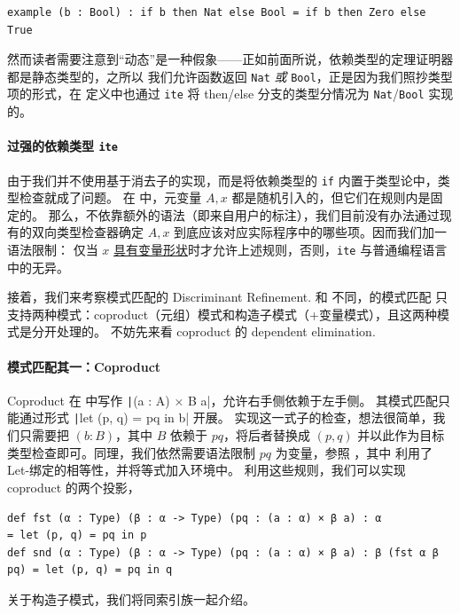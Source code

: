 \documentclass[a4paper, 11pt]{article}
\theoremstyle{remark}\newtheorem*{remark}{Remark}
\theoremstyle{definition}\newtheorem*{definition}{Definition}
\begin{document}
\begin{verbatim}
example (b : Bool) : if b then Nat else Bool = if b then Zero else True
\end{verbatim}

然而读者需要注意到“动态”是一种假象——正如前面所说，依赖类型的定理证明器都是静态类型的，之所以
我们允许函数返回 \texttt{Nat} \emph{或} \texttt{Bool}，正是因为我们照抄类型项的形式，在
定义中也通过 \texttt{ite} 将 then/else 分支的类型分情况为 \texttt{Nat}/\texttt{Bool} 实现的。

\paragraph{过强的依赖类型 \texttt{ite}}
由于我们并不使用基于消去子的实现，而是将依赖类型的 \texttt{if} 内置于类型论中，类型检查就成了问题。
在  中，元变量 $A, x$ 都是随机引入的，但它们在规则内是固定的。
那么，不依靠额外的语法（即来自用户的标注），我们目前没有办法通过现有的双向类型检查器确定 $A, x$
到底应该对应实际程序中的哪些项。因而我们加一语法限制：
仅当 $x$ \underline{具有变量形状}时才允许上述规则，否则，\texttt{ite} 与普通编程语言中的无异。

接着，我们来考察模式匹配的 Discriminant Refinement. 和 \Tigris 不同，\Tigrisd 的模式匹配
只支持两种模式：coproduct（元组）模式和构造子模式（+变量模式），且这两种模式是分开处理的。
不妨先来看 coproduct 的 dependent elimination.
\paragraph{模式匹配其一：Coproduct}
Coproduct 在 \Tigrisd 中写作 \texttt|(a : A) × B a|，允许右手侧依赖于左手侧。
其模式匹配只能通过形式 \texttt|let (p, q) = pq in b| 开展。
实现这一式子的检查，想法很简单，我们只需要把 $(b : B)$，其中 $B$ 依赖于 $pq$，将后者替换成 $(p, q)$
并以此作为目标类型检查即可。同理，我们依然需要语法限制 $pq$ 为变量，参照 ，其中  利用了 Let-绑定的相等性，并将等式加入环境中。
利用这些规则，我们可以实现 coproduct 的两个投影，

\begin{verbatim}
def fst (α : Type) (β : α -> Type) (pq : (a : α) × β a) : α              = let (p, q) = pq in p
def snd (α : Type) (β : α -> Type) (pq : (a : α) × β a) : β (fst α β pq) = let (p, q) = pq in q
\end{verbatim}

关于构造子模式，我们将同索引族一起介绍。
\end{document}
